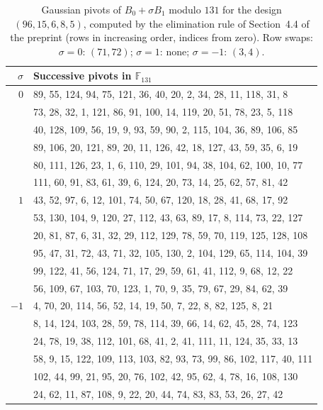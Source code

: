 \begin{table}[ht]
\centering
\small
\begin{tabular}{rl}
\hline
$\sigma$ & Successive pivots in $\mathbb{F}_{131}$ \\
\hline
$0$ & 89, 55, 124, 94, 75, 121, 36, 40, 20, 2, 34, 28, 11, 118, 31, 8 \\
 & 73, 28, 32, 1, 121, 86, 91, 100, 14, 119, 20, 51, 78, 23, 5, 118 \\
 & 40, 128, 109, 56, 19, 9, 93, 59, 90, 2, 115, 104, 36, 89, 106, 85 \\
 & 89, 106, 20, 121, 89, 20, 11, 126, 42, 18, 127, 43, 59, 35, 6, 19 \\
 & 80, 111, 126, 23, 1, 6, 110, 29, 101, 94, 38, 104, 62, 100, 10, 77 \\
 & 111, 60, 91, 83, 61, 39, 6, 124, 20, 73, 14, 25, 62, 57, 81, 42 \\
\hline
$1$ & 43, 52, 97, 6, 12, 101, 74, 50, 67, 120, 18, 28, 41, 68, 17, 92 \\
 & 53, 130, 104, 9, 120, 27, 112, 43, 63, 89, 17, 8, 114, 73, 22, 127 \\
 & 20, 81, 87, 6, 31, 32, 29, 112, 129, 78, 59, 70, 119, 125, 128, 108 \\
 & 95, 47, 31, 72, 43, 71, 32, 105, 130, 2, 104, 129, 65, 114, 104, 39 \\
 & 99, 122, 41, 56, 124, 71, 17, 29, 59, 61, 41, 112, 9, 68, 12, 22 \\
 & 56, 109, 67, 103, 70, 123, 1, 70, 9, 35, 79, 67, 29, 84, 62, 39 \\
\hline
$-1$ & 4, 70, 20, 114, 56, 52, 14, 19, 50, 7, 22, 8, 82, 125, 8, 21 \\
 & 8, 14, 124, 103, 28, 59, 78, 114, 39, 66, 14, 62, 45, 28, 74, 123 \\
 & 24, 78, 19, 38, 112, 101, 68, 41, 2, 41, 111, 11, 124, 35, 33, 13 \\
 & 58, 9, 15, 122, 109, 113, 103, 82, 93, 73, 99, 86, 102, 117, 40, 111 \\
 & 102, 44, 99, 21, 95, 20, 76, 102, 42, 95, 62, 4, 78, 16, 108, 130 \\
 & 24, 62, 11, 87, 108, 9, 22, 20, 44, 74, 83, 83, 53, 26, 27, 42 \\
\hline
\end{tabular}
\caption{Gaussian pivots of $B_0+\sigma B_1$ modulo $131$ for the design $(96,15,6,8,5)$, computed by the elimination rule of Section~4.4 of the preprint (rows in increasing order, indices from zero). Row swaps: $\sigma=0$: $(71,72)$; $\sigma=1$: none; $\sigma=-1$: $(3,4)$.}
\label{tab:pivots131}
\end{table}
